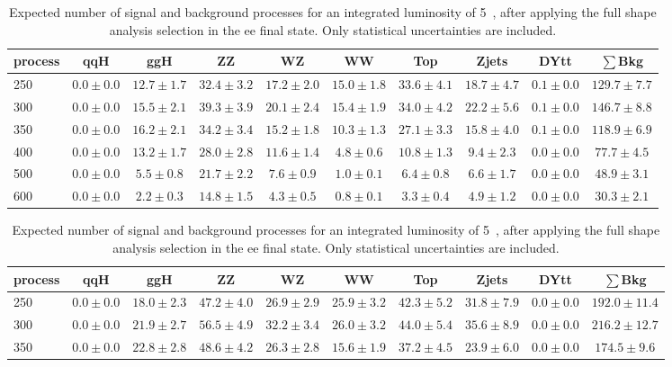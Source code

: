 \begin{table}[!ht]
{\footnotesize
 \begin{center}
 \begin{tabular}{l| c c | c c c c c c c }
 \hline
 process & qqH & ggH & ZZ & WZ & WW & Top & Zjets & DYtt & $\sum$Bkg \\
 \hline
250 & $0.0\pm0.0$ & $12.7\pm1.7$ & $32.4\pm3.2$ & $17.2\pm2.0$ & $15.0\pm1.8$ & $33.6\pm4.1$ & $18.7\pm4.7$ & $0.1\pm0.0$ & $129.7\pm7.7$ \\
300 & $0.0\pm0.0$ & $15.5\pm2.1$ & $39.3\pm3.9$ & $20.1\pm2.4$ & $15.4\pm1.9$ & $34.0\pm4.2$ & $22.2\pm5.6$ & $0.1\pm0.0$ & $146.7\pm8.8$ \\
350 & $0.0\pm0.0$ & $16.2\pm2.1$ & $34.2\pm3.4$ & $15.2\pm1.8$ & $10.3\pm1.3$ & $27.1\pm3.3$ & $15.8\pm4.0$ & $0.1\pm0.0$ & $118.9\pm6.9$ \\
400 & $0.0\pm0.0$ & $13.2\pm1.7$ & $28.0\pm2.8$ & $11.6\pm1.4$ & $4.8\pm0.6$ & $10.8\pm1.3$ & $9.4\pm2.3$ & $0.0\pm0.0$ & $77.7\pm4.5$ \\
500 & $0.0\pm0.0$ & $5.5\pm0.8$ & $21.7\pm2.2$ & $7.6\pm0.9$ & $1.0\pm0.1$ & $6.4\pm0.8$ & $6.6\pm1.7$ & $0.0\pm0.0$ & $48.9\pm3.1$ \\
600 & $0.0\pm0.0$ & $2.2\pm0.3$ & $14.8\pm1.5$ & $4.3\pm0.5$ & $0.8\pm0.1$ & $3.3\pm0.4$ & $4.9\pm1.2$ & $0.0\pm0.0$ & $30.3\pm2.1$ \\
\hline
\end{tabular}
\end{center}
}
\caption{\fixme Expected number of signal and background processes for an integrated luminosity of 5~\ifb, 
after applying the full shape analysis selection in the ee final state. Only statistical uncertainties are included. }
\label{tab:yield_mc_5fb_ee}
{\footnotesize
 \begin{center}
 \begin{tabular}{l | c c | c c c c c c c }
 \hline
 process & qqH & ggH & ZZ & WZ & WW & Top & Zjets & DYtt & $\sum$Bkg  \\
 \hline
250 & $0.0\pm0.0$ & $18.0\pm2.3$ & $47.2\pm4.0$ & $26.9\pm2.9$ & $25.9\pm3.2$ & $42.3\pm5.2$ & $31.8\pm7.9$ & $0.0\pm0.0$ & $192.0\pm11.4$ \\
300 & $0.0\pm0.0$ & $21.9\pm2.7$ & $56.5\pm4.9$ & $32.2\pm3.4$ & $26.0\pm3.2$ & $44.0\pm5.4$ & $35.6\pm8.9$ & $0.0\pm0.0$ & $216.2\pm12.7$ \\
350 & $0.0\pm0.0$ & $22.8\pm2.8$ & $48.6\pm4.2$ & $26.3\pm2.8$ & $15.6\pm1.9$ & $37.2\pm4.5$ & $23.9\pm6.0$ & $0.0\pm0.0$ & $174.5\pm9.6$ \\

\end{tabular}
\end{center}}
\end{table}
